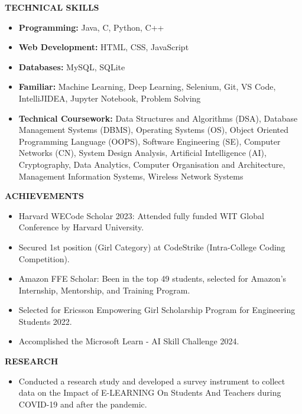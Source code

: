 \documentclass[a4paper,10pt]{article}
\newcommand{\resheading}[1]{\medskip
    \colorbox{mygrey}{\begin{minipage}{\dimexpr\textwidth-2\fboxsep\relax}\small 
                        \textbf{#1 \vphantom{p\^{E}}}
                      \end{minipage}}
                            \par\medskip}
\begin{document}
\resheading{TECHNICAL SKILLS}
    \begin{itemize}
    \item \textbf{Programming: }
    {Java, C, Python, C++}

    \item \textbf{Web Development: }
     {HTML, CSS, JavaScript}

    \item \textbf{Databases: }
     {MySQL, SQLite} 

     \item \textbf{Familiar: }
     {Machine Learning, Deep Learning, Selenium, Git, VS Code, IntelliJIDEA, Jupyter Notebook, Problem Solving}

     \item \textbf{Technical Coursework: }
     {Data Structures and Algorithms (DSA), Database Management Systems (DBMS), Operating Systems (OS), Object Oriented Programming Language (OOPS), Software Engineering (SE), Computer Networks (CN), System Design Analysis, Artificial Intelligence (AI), Cryptography, Data Analytics, Computer Organisation and Architecture, Management Information Systems, Wireless Network Systems}
    
\end{itemize}

\resheading{ACHIEVEMENTS} 
\begin{itemize}
     \item Harvard WECode Scholar 2023: Attended fully funded WIT Global Conference by Harvard University.
     \item Secured 1st position (Girl Category) at CodeStrike (Intra-College Coding Competition). 
    \item Amazon FFE Scholar: Been in the top 49 students, selected for Amazon's Internship, Mentorship, and Training Program.
    \item Selected for Ericsson Empowering Girl Scholarship Program for Engineering Students 2022.
    \item Accomplished the Microsoft Learn - AI Skill Challenge 2024.
    
\end{itemize}

\resheading{RESEARCH} 
\begin{itemize}
    \item Conducted a research study and developed a survey instrument to collect data on the Impact of E-LEARNING On Students And Teachers during COVID-19 and after the pandemic.

\end{itemize}
\end{document}
